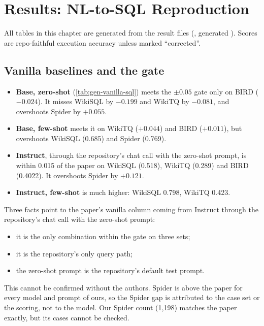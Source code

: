 \chapter{Results: NL-to-SQL Reproduction}\label{ch:results-sql}

All tables in this chapter are generated from the result files (, generated
\tablesgenerated). Scores are repo-faithful execution accuracy unless marked ``corrected''.

\section{Vanilla baselines and the gate}\label{sec:sql-vanilla}



\begin{observation}
\begin{itemize}
\item \textbf{Base, zero-shot} (\cref{tab:gen-vanilla-sql}) meets the $\pm0.05$ gate only on BIRD ($-0.024$). It misses
WikiSQL by $-0.199$ and WikiTQ by $-0.081$, and overshoots Spider by $+0.055$.
\item \textbf{Base, few-shot} meets it on WikiTQ ($+0.044$) and BIRD ($+0.011$), but overshoots WikiSQL (0.685) and
Spider (0.769).
\item \textbf{Instruct}, through the repository's chat call with the zero-shot prompt, is within 0.015 of the paper on
WikiSQL (0.518), WikiTQ (0.289) and BIRD (0.4022). It overshoots Spider by $+0.121$.
\item \textbf{Instruct, few-shot} is much higher: WikiSQL 0.798, WikiTQ 0.423.
\end{itemize}
\end{observation}

\begin{interpretation}
Three facts point to the paper's vanilla column coming from Instruct through the repository's chat call with the
zero-shot prompt:
\begin{itemize}
\item it is the only combination within the gate on three sets;
\item it is the repository's only query path;
\item the zero-shot prompt is the repository's default test prompt.
\end{itemize}
This cannot be confirmed without the authors. Spider is above the paper for every model and prompt of ours, so the
Spider gap is attributed to the case set or the scoring, not to the model. Our Spider count (1,198) matches the paper
exactly, but its cases cannot be checked.
\end{interpretation}

